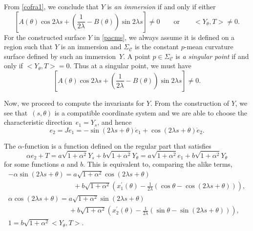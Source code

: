 \documentclass[pdftex]{sigma}
\numberwithin{equation}{section}
\begin{document}
From \eqref{cofra1}, we conclude that $Y$ is \emph{an immersion} if and
only if either
\[
\left[A(\theta)\cos{2\lambda s}+\left(\frac{1}{2\lambda}-B(\theta)\right)\sin
{2\lambda s}\right]\neq 0\qquad \text{or}\qquad \big<Y_{\theta},T\big>\neq 0.
\]
For the constructed surface $Y$ in \eqref{pacms}, we always assume it is
defined on a region such that $Y$ is an immersion and $\Sigma_{\mathcal{C}}$
is the constant $p$-mean curvature surface defined by such an immersion~$Y$.
A point $p\in \Sigma_{\mathcal{C}}$ is \emph{a singular point} if and only
if $\big<Y_{\theta},T\big>=0$. Thus at a singular point, we must have
\[
\left[A(\theta)\cos{2\lambda s}+\left(\frac{1}{2\lambda}-B(\theta)\right)\sin
{2\lambda s}\right]\neq 0.
\]

Now, we proceed to compute the invariants for $Y$. From the construction of $
Y $, we see that~$(s,\theta)$ is a compatible coordinate system and we are able to
choose the characteristic direction~${e_{1}=Y_{s}}$, and hence
\[
e_{2}=Je_{1}=-\sin{(2\lambda s+\theta)}\mathring e_1+\cos{(2\lambda s+\theta)
}\mathring e_2.
\]

The $\alpha $-function is a function defined on the regular part that
satisfies \[\alpha e_{2}+T=a\sqrt{1+\alpha ^{2}}Y_{s}+b\sqrt{1+\alpha ^{2}}
Y_{\theta }=a\sqrt{1+\alpha ^{2}}e_{1}+b\sqrt{1+\alpha ^{2}}Y_{\theta }\] for
some functions $a$ and $b$. This is equivalent to, comparing the alike terms,
\begin{gather*}
-\alpha \sin {(2\lambda s+\theta )} =a\sqrt{1+\alpha ^{2}}\cos {(2\lambda
s+\theta )}\\
\phantom{-\alpha \sin {(2\lambda s+\theta )} =}{}+b\sqrt{1+\alpha ^{2}}\left( x_{1}^{\prime }(\theta )-\frac{1}{
2\lambda }(\cos {\theta }-\cos {(2\lambda s+\theta )})\right), \\
\alpha \cos {(2\lambda s+\theta )}=a\sqrt{1+\alpha ^{2}}\sin {(2\lambda
s+\theta )}\\
\phantom{\alpha \cos {(2\lambda s+\theta )}=}{}+b\sqrt{1+\alpha ^{2}}\left( x_{2}^{\prime }(\theta )-\frac{1}{
2\lambda }(\sin {\theta }-\sin {(2\lambda s+\theta )})\right), \\
1 =b\sqrt{1+\alpha ^{2}}\big<Y_{\theta },T\big>.
\end{gather*}
\end{document}
